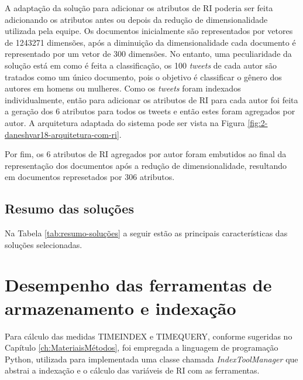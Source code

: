 				A adaptação da solução para adicionar os atributos de RI poderia ser feita adicionando os atributos antes ou depois da redução de dimensionalidade utilizada pela equipe.
				Os documentos inicialmente são representados por vetores de 1243271 dimensões, após a diminuição da dimensionalidade cada documento é representado por um vetor de 300 dimensões.
				No entanto, uma peculiaridade da solução está em como é feita a classificação, os 100 \textit{tweets} de cada autor são tratados como um único documento, pois o objetivo é classificar o gênero dos autores em homens ou mulheres.
				Como os \textit{tweets} foram indexados individualmente, então para adicionar os atributos de RI para cada autor foi feita a geração dos 6 atributos para todos os tweets e então estes foram agregados por autor.
				A arquitetura adaptada do sistema pode ser vista na Figura \ref{fig:2-daneshvar18-arquitetura-com-ri}.

				

				Por fim, os 6 atributos de RI agregados por autor foram embutidos ao final da representação dos documentos após a redução de dimensionalidade, resultando em documentos represetados por 306 atributos.


		\subsection{Resumo das soluções} \label{sec:ResumoDasSoluções}
			Na Tabela \ref{tab:resumo-soluções} a seguir estão as principais características das soluções selecionadas.

			

	\section{Desempenho das ferramentas de armazenamento e indexação} \label{sec:DesempenhoFerramentas}
		Para cálculo das medidas TIME\underscore{}INDEX e TIME\underscore{}QUERY, conforme sugeridas no Capítulo \ref{ch:MateriaisMétodos}, foi empregada a linguagem de programação Python, utilizada para implementada uma classe chamada \textit{IndexToolManager} que abstrai a indexação e o cálculo das variáveis de RI com as ferramentas. 

